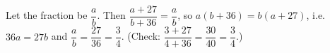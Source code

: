 Let the fraction be $\dfrac {a}{b}$. Then $\dfrac{a+27}{b+36}=\dfrac {a}{b}$, so $a(b+36)=b(a+27)$, i.e.\ $36a=27b$ and $\dfrac {a}{b}=\dfrac{27}{36}=\boxed{\dfrac{3}{4}}$. (Check: $\dfrac{3+27}{4+36}=\dfrac{30}{40}=\dfrac{3}{4}$.)
